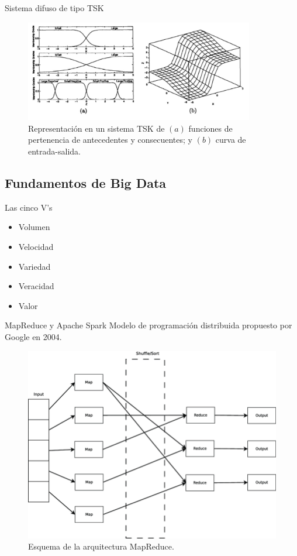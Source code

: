 \documentclass[spanish]{beamer}
\begin{document}
\begin{frame}{Sistema difuso de tipo TSK}
\begin{figure}
	\centering
	\includegraphics[width=27em]{img/tsk}
	\caption{\footnotesize Representación en un sistema TSK de $(a)$ funciones de pertenencia de antecedentes y consecuentes; y $(b)$ curva de entrada-salida.}
\end{figure}
\end{frame}


\subsection{Fundamentos de Big Data}

\begin{frame}{Las cinco V's}
\begin{itemize}[<+->]
  \item Volumen
  \item Velocidad
  \item Variedad
  \item Veracidad
  \item Valor
\end{itemize}
\end{frame}

\begin{frame}{MapReduce y Apache Spark}
  Modelo de programación distribuida propuesto por Google en 2004.

  \begin{figure}
	\centering
	\includegraphics[width=.6\textwidth]{img/mapreduce}
	\caption{\footnotesize Esquema de la arquitectura MapReduce.}
\end{figure}
\end{frame}
\end{document}

